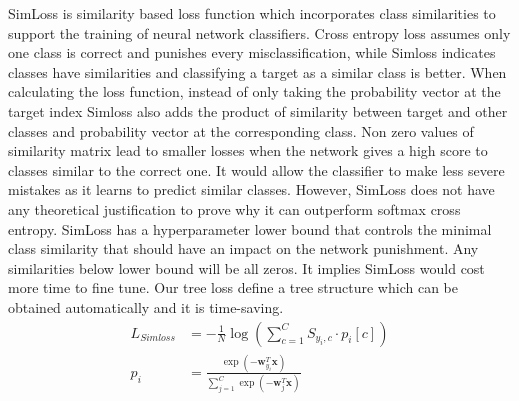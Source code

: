 \documentclass[twoside]{article}
\theoremstyle{definition}
\newcommand{\R}{\mathbb R}
\newcommand{\trans}[1]{{#1}^{T}}
\newcommand{\vv}{\mathbf v}
\newcommand{\w}{\mathbf w}
\newcommand{\x}{\mathbf x}
\begin{document}
SimLoss \cite{Kobs2020SimLossCS} is similarity based loss function which incorporates class similarities to support the training of neural network classifiers.
Cross entropy loss assumes only one class is correct and punishes every misclassification, while Simloss indicates classes have similarities and classifying a target as a similar class is better.
When calculating the loss function, instead of only taking the probability vector at the target index Simloss also adds the product of similarity between target and other classes and probability vector at the corresponding class. 
Non zero values of similarity matrix lead to smaller losses when the network gives a high score to classes similar to the correct one. 
It would allow the classifier to make less severe mistakes as it learns to predict similar classes.
However, SimLoss does not have any theoretical justification to prove why it can outperform softmax cross entropy.
SimLoss has a hyperparameter lower bound that controls the minimal class similarity that should have an impact on the network punishment.
Any similarities below lower bound will be all zeros.
It implies SimLoss would cost more time to fine tune.
Our tree loss define a tree structure which can be obtained automatically and it is time-saving.
\begin{align}
    L_{Simloss}&=-\frac{1}{N}\log(\sum_{c=1}^{C}S_{y_i,c}\cdot p_i[c])\\
    p_i&=\frac {\exp(-\trans\w_{y_i} \x)}{\sum_{j=1}^C \exp(-\trans \w_j \x)}
\end{align}



\end{document}
